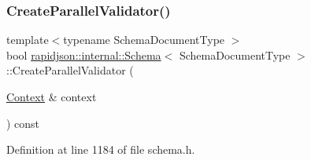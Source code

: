 \mbox{\label{classrapidjson_1_1internal_1_1_schema_aa8e9504b3e7bea6e6f6e80ea302c252d}} 
\subsubsection{\texorpdfstring{CreateParallelValidator()}{CreateParallelValidator()}}
{\footnotesize\ttfamily template$<$typename Schema\+Document\+Type $>$ \\
bool \mbox{\hyperlink{classrapidjson_1_1internal_1_1_schema}{rapidjson\+::internal\+::\+Schema}}$<$ Schema\+Document\+Type $>$\+::Create\+Parallel\+Validator (\begin{DoxyParamCaption}\item[{\mbox{\hyperlink{classrapidjson_1_1internal_1_1_schema_afca06b1f51d1bc18403bdf3f4d55ffef}{Context}} \&}]{context }\end{DoxyParamCaption}) const\hspace{0.3cm}{\ttfamily [private]}}



Definition at line 1184 of file schema.\+h.



